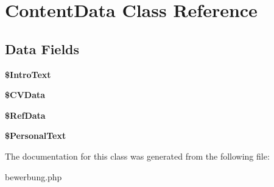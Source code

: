 \hypertarget{class_content_data}{\section{Content\-Data Class Reference}
\label{class_content_data}
}
\subsection*{Data Fields}
\begin{DoxyCompactItemize}
\item 
\hypertarget{class_content_data_a2fba29bca1af9e02b09f71d54089fd25}{{\bfseries \$\-Intro\-Text}}\label{class_content_data_a2fba29bca1af9e02b09f71d54089fd25}

\item 
\hypertarget{class_content_data_a8cdca533532ded662c40e8cfc030901c}{{\bfseries \$\-C\-V\-Data}}\label{class_content_data_a8cdca533532ded662c40e8cfc030901c}

\item 
\hypertarget{class_content_data_a9bba7736b421870f268448d29be37780}{{\bfseries \$\-Ref\-Data}}\label{class_content_data_a9bba7736b421870f268448d29be37780}

\item 
\hypertarget{class_content_data_a95c5b9513ef5568fd67d0986fcdd8ca3}{{\bfseries \$\-Personal\-Text}}\label{class_content_data_a95c5b9513ef5568fd67d0986fcdd8ca3}

\end{DoxyCompactItemize}


The documentation for this class was generated from the following file\-:\begin{DoxyCompactItemize}
\item 
bewerbung.\-php\end{DoxyCompactItemize}
